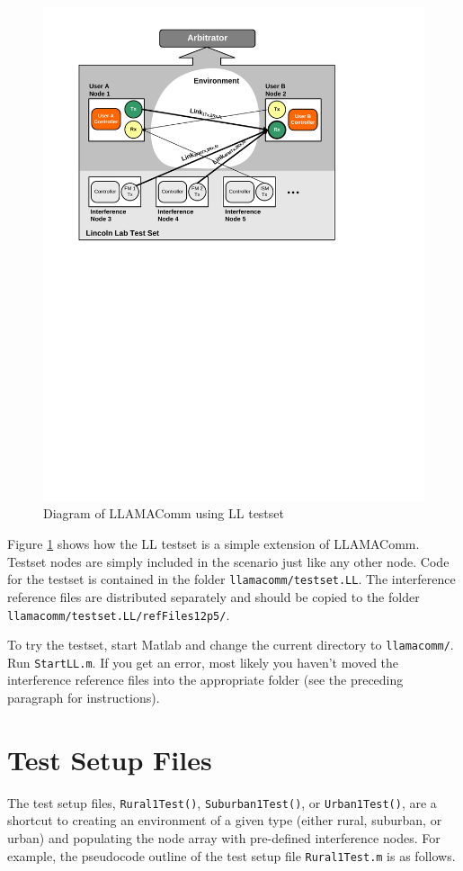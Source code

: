 \begin{figure}[h]
\centering
\includegraphics[width=5in]{"figs/Testset"}
\caption{Diagram of LLAMAComm using LL testset}
\label{fig:testSetEx}
\end{figure}

Figure \ref{fig:testSetEx} shows how the LL testset is a simple
extension of LLAMAComm.  Testset nodes are simply included in the
scenario just like any other node.  Code for the testset is
contained in the folder \verb+llamacomm/testset.LL+. The
interference reference files are distributed separately and should
be copied to the folder \verb+llamacomm/testset.LL/refFiles12p5/+.

To try the testset, start Matlab and change the current directory to
\verb+llamacomm/+.  Run \verb+StartLL.m+.  If you get an error, most
likely you haven't moved the interference reference files into the
appropriate folder (see the preceding paragraph for instructions).

\section{Test Setup Files}
The test setup files, \verb+Rural1Test()+, \verb+Suburban1Test()+, or
\verb+Urban1Test()+, are a shortcut to creating an environment of a given type
(either rural, suburban, or urban) and populating the node array with
pre-defined interference nodes.  For example, the pseudocode outline of the
test setup file \verb+Rural1Test.m+ is as follows.

